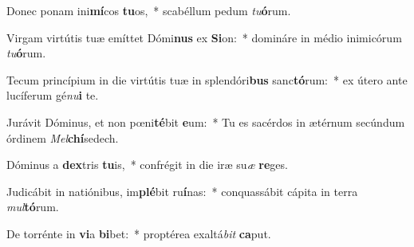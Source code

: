 \item Donec ponam ini\textbf{mí}cos \textbf{tu}os,~* scabéllum pedum \textit{tu}\textbf{ó}rum.
\item Virgam virtútis tuæ emíttet Dómi\textbf{nus} ex \textbf{Si}on:~* domináre in médio inimicórum \textit{tu}\textbf{ó}rum.
\item Tecum princípium in die virtútis tuæ in splendóri\textbf{bus} sanc\textbf{tó}rum:~* ex útero ante lucíferum gé\textit{nu}\textbf{i} te.
\item Jurávit Dóminus, et non pœni\textbf{té}bit \textbf{e}um:~* Tu es sacérdos in ætérnum secúndum órdinem \textit{Mel}\textbf{chí}sedech.
\item Dóminus a \textbf{dex}tris \textbf{tu}is,~* confrégit in die iræ su\textit{æ} \textbf{re}ges.
\item Judicábit in natiónibus, im\textbf{plé}bit ru\textbf{í}nas:~* conquassábit cápita in terra \textit{mul}\textbf{tó}rum.
\item De torrénte in \textbf{vi}a \textbf{bi}bet:~* proptérea exaltá\textit{bit} \textbf{ca}put.
